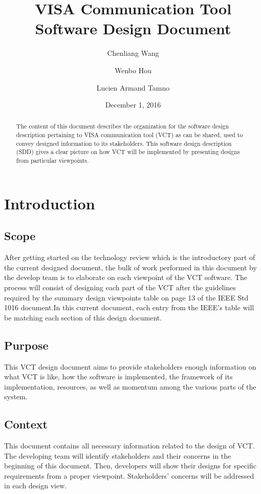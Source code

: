 \documentclass [10pt]{article}
\title{VISA Communication Tool Software Design Document}
\author[1]{Chenliang Wang}
\author[1]{Wenbo Hou}
\author[1]{Lucien Armand Tamno}
\affil[1]{Oregon State University}
\date {December 1, 2016}
\begin{document}
\begin{titlepage}
\maketitle
\begin{abstract}
The content of this document describes the organization for the software design description pertaining to VISA communication tool (VCT) as can be shared, used to convey designed information to its stakeholders. This software design description (SDD) gives a clear picture on how VCT will be implemented by presenting designs from particular viewpoints.   
\end{abstract}
\end{titlepage}

\tableofcontents
\newpage
\section{Introduction}
\subsection{Scope}  
After getting started on the technology review which is the introductory part of the current designed document, the bulk of work performed in this document by the develop team is to elaborate on each viewpoint of the VCT software. The process will consist of  designing each part of the VCT after the guidelines required by the summary design viewpoints table on page 13 of the IEEE Std  1016 document.In this current document, each entry from the IEEE's table will be matching each section of this design document.
\subsection{Purpose}
This VCT design document aims to provide stakeholders enough information on what VCT is like, how the software is implemented, the framework of its implementation, resources, as well as momentum among the various parts of the system.
\subsection{Context}
This document contains all necessary information related to the design of VCT. The developing team will identify stakeholders and their concerns in the beginning of this document. Then, developers will show their designs for specific requirements from a proper viewpoint. Stakeholders' concerns will be addressed in each design view.   
\end{document}
